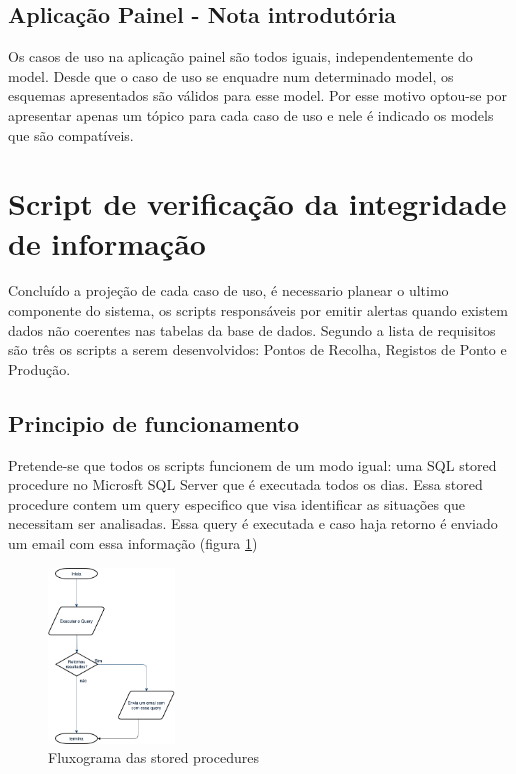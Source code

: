 \subsection{Aplicação Painel - Nota introdutória}
Os casos de uso na aplicação painel são todos iguais, independentemente do model. Desde que o caso de uso se enquadre num determinado model, os esquemas apresentados são válidos para esse model. Por esse motivo optou-se por apresentar apenas um tópico para cada caso de uso e nele é indicado os models que são compatíveis.


\newpage

\newpage

\newpage

\newpage

\newpage

\newpage

\newpage

\section{Script de verificação da integridade de informação}
Concluído a projeção de cada caso de uso, é necessario planear o ultimo componente do sistema, os scripts responsáveis por emitir alertas quando existem dados não coerentes nas tabelas da base de dados. Segundo a lista de requisitos são três os scripts a serem desenvolvidos: Pontos de Recolha, Registos de Ponto e Produção.

\subsection{Principio de funcionamento}
Pretende-se que todos os scripts funcionem de um modo igual: uma SQL stored procedure no Microsft SQL Server que é executada todos os dias. Essa stored procedure contem um query especifico que visa identificar as situações que necessitam ser analisadas. Essa query é executada e caso haja retorno é enviado um email com essa informação (figura \ref{fig:stored_procedure})

\begin{figure}[h] 
	\begin{center}
		\includegraphics[width=0.30\textwidth,keepaspectratio]{figuras/FluxogramaEmail.png}
		\caption{Fluxograma das stored procedures}
		\label{fig:stored_procedure} 
	\end{center}
\end{figure}


